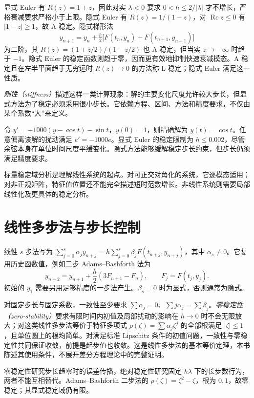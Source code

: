 显式 Euler 有 $R(z)=1+z$，因此对实 $\lambda<0$ 要求 $0<h\le2/|\lambda|$ 才不增长，严格衰减要求严格小于上限。隐式 Euler 有 $R(z)=1/(1-z)$，对 $\operatorname{Re}z\le0$ 有 $|1-z|\ge1$，故 A 稳定。隐式梯形法
\[
 y_{n+1}=y_n+\tfrac h2\bigl[F(t_n,y_n)+F(t_{n+1},y_{n+1})\bigr]
\]
为二阶，其 $R(z)=(1+z/2)/(1-z/2)$ 也 A 稳定，但当实 $z\to-\infty$ 时趋于 $-1$。隐式 Euler 的稳定函数则趋于零，因而更有效地抑制快速衰减模态。A 稳定且在左半平面趋于无穷远时 $R(z)\to0$ 的方法称 L 稳定；隐式 Euler 满足这一性质。

\emph{刚性（stiffness）}描述这样一类计算现象：解的主要变化尺度允许较大步长，但显式方法为了稳定必须采用很小步长。它依赖方程、区间、方法和精度要求，不仅由某个系数“大”来定义。

\begin{example}[平滑解与快速扰动模态]
令 $y'=-1000(y-\cos t)-\sin t$，$y(0)=1$，则精确解为 $y(t)=\cos t$。任意偏离该解的扰动满足 $e'=-1000e$。显式 Euler 的稳定限制为 $h\le0.002$，尽管余弦本身在单位时间尺度平缓变化。隐式方法能够缓解稳定步长约束，但步长仍须满足精度要求。
\end{example}

标量稳定域分析是理解线性系统的起点。对可正交对角化的系统，它逐模态适用；对非正规矩阵，特征值位置还不能完全描述短时范数增长。非线性系统则需要局部线性化及更具体的稳定分析。

\section{线性多步法与步长控制}
线性 $s$ 步法写为 $\sum_{j=0}^s\alpha_jy_{n+j}=h\sum_{j=0}^s\beta_jF(t_{n+j},y_{n+j})$，其中 $\alpha_s\ne0$。它复用历史函数值，例如二步 Adams--Bashforth 法为
\[
 y_{n+2}=y_{n+1}+\frac h2(3F_{n+1}-F_n),\qquad F_j=F(t_j,y_j).
\]
初始的 $y_1$ 需要另用足够精度的一步法产生。$\beta_s=0$ 时为显式，否则通常为隐式。

对固定步长与固定系数，一致性至少要求 $\sum\alpha_j=0$、$\sum j\alpha_j=\sum\beta_j$。\emph{零稳定性（zero-stability）}要求有限时间内初值及局部扰动的影响在 $h\to0$ 时不会无限放大；对这类线性多步法等价于特征多项式 $\rho(\zeta)=\sum\alpha_j\zeta^j$ 的全部根满足 $|\zeta|\le1$，且单位圆上的根均简单。对满足标准 Lipschitz 条件的初值问题，一致性与零稳定性共同保证收敛，前提是起步值也收敛。这是线性多步法的基本等价定理，本书陈述其使用条件，不展开差分方程理论中的完整证明。

零稳定性研究步长趋零时的误差传播，绝对稳定性研究固定 $h\lambda$ 下的长步数行为，两者不能互相替代。Adams--Bashforth 二步法的 $\rho(\zeta)=\zeta^2-\zeta$，根为 $0,1$，故零稳定；其显式稳定域仍有限。

